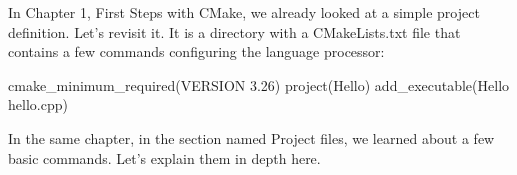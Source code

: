 In Chapter 1, First Steps with CMake, we already looked at a simple project definition. Let’s revisit it. It is a directory with a CMakeLists.txt file that contains a few commands configuring the language processor:


\begin{cmake}
cmake_minimum_required(VERSION 3.26)
project(Hello)
add_executable(Hello hello.cpp)
\end{cmake}

In the same chapter, in the section named Project files, we learned about a few basic commands. Let’s explain them in depth here.








